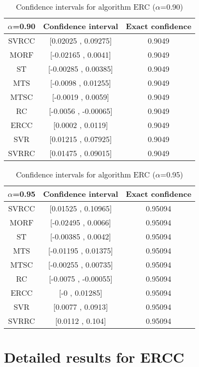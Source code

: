 \documentclass[a4paper,10pt]{article}
\begin{document}
\begin{table}[!htp]
\centering\small
\begin{tabular}{
|c|c|c|}
\hline
 $\alpha$=0.90 & Confidence interval & Exact confidence \\ \hline 
SVRCC & [0.02025 , 0.09275] & 0.9049\\ \hline 
MORF & [-0.02165 , 0.0041] & 0.9049\\ \hline 
ST & [-0.00285 , 0.00385] & 0.9049\\ \hline 
MTS & [-0.0098 , 0.01255] & 0.9049\\ \hline 
MTSC & [-0.0019 , 0.0059] & 0.9049\\ \hline 
RC & [-0.0056 , -0.00065] & 0.9049\\ \hline 
ERCC & [0.0002 , 0.0119] & 0.9049\\ \hline 
SVR & [0.01215 , 0.07925] & 0.9049\\ \hline 
SVRRC & [0.01475 , 0.09015] & 0.9049\\ \hline 

\end{tabular}
\caption{Confidence intervals for algorithm ERC ($\alpha$=0.90)}
\end{table}
\begin{table}[!htp]
\centering\small
\begin{tabular}{
|c|c|c|}
\hline
 $\alpha$=0.95 & Confidence interval & Exact confidence \\ \hline 
SVRCC & [0.01525 , 0.10965] & 0.95094\\ \hline 
MORF & [-0.02495 , 0.0066] & 0.95094\\ \hline 
ST & [-0.00385 , 0.0042] & 0.95094\\ \hline 
MTS & [-0.01195 , 0.01375] & 0.95094\\ \hline 
MTSC & [-0.00255 , 0.00735] & 0.95094\\ \hline 
RC & [-0.0075 , -0.00055] & 0.95094\\ \hline 
ERCC & [-0 , 0.01285] & 0.95094\\ \hline 
SVR & [0.0077 , 0.0913] & 0.95094\\ \hline 
SVRRC & [0.0112 , 0.104] & 0.95094\\ \hline 

\end{tabular}
\caption{Confidence intervals for algorithm ERC ($\alpha$=0.95)}
\end{table}

 \clearpage 


\section{Detailed results for ERCC}
\end{document}
